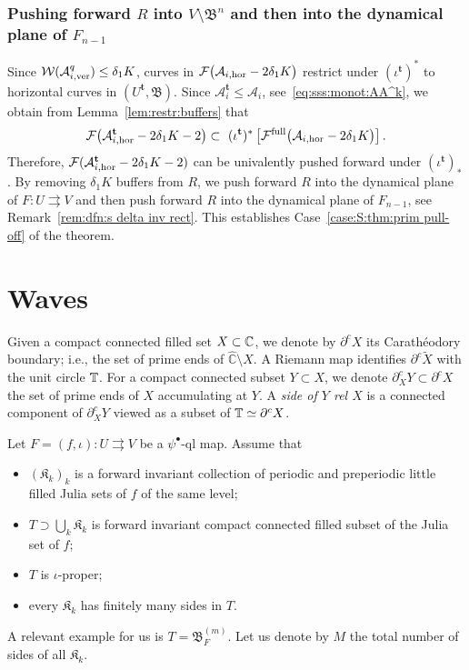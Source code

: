 \documentclass{amsart}
\newcommand\full{{\operatorname{full}}}
\newcommand{\wC}{\widehat{\mathbb{C}}}
\newcommand{\filled}{{\mathfrak K }}
\newcommand{\bush}{{\mathfrak B }}
\newcommand{\bbush}{{\boldsymbol {\mathfrak B} }}
\newcommand{\1}{{\mathbb 1 }}
\newcommand{\Fam}{{\mathcal F}}
\newcommand{\Width}{{\mathcal W}}
\newcommand{\rrto}{\rightrightarrows}
\renewcommand{\AA}{{\mathcal A}}
\newcommand{\bbt}{{\mathbf t}}
\begin{document}
\subsubsection{Pushing forward $R$ into $V\setminus\bbush^{n}$ and then into the dynamical plane of $F_{n-1}$} Since $\Width(\AA_{i,\ver}^{q})\le \delta_1 K$, curves in $\Fam\big(\AA_{i,\hor}-2\delta_1 K\big)$ restrict under $(\iota^\bbt)^*$ to horizontal curves in $(U^\bbt,\bbush)$. Since $\AA^{\bbt}_i \le \AA_i$, see~\eqref{eq:sss:monot:AA^k}, we obtain from Lemma~\ref{lem:restr:buffers} that 
\[\Fam\big(\AA^\bbt_{i,\hor}-2 \delta_1 K -2\big)  \subset\ (\iota^\bbt)^*\left[ \Fam^\full\big(\AA_{i,\hor}-2\delta_1 K\big) \right]. \]
Therefore, $\Fam(\AA^\bbt_{i,\hor}-2 \delta_1 K -2)$ can be univalently pushed forward under $(\iota^\bbt)_*$. By removing $\delta_1K$ buffers from $R$, we push forward $R$ into the dynamical plane of $F\colon  U\rightrightarrows V$ and then push forward $R$ into the dynamical plane of $F_{n-1}$, see Remark~\ref{rem:dfn:s delta inv rect}. This establishes Case~\ref{case:S:thm:prim pull-off} of the theorem.












\section{Waves}\label{waves sec} 
Given a compact connected filled set $ X\subset {\Bbb C}$, we denote by $\partial ^c X$ its Carath\'eodory boundary;  i.e., the set of prime ends of $\wC\setminus X$. A Riemann map identifies $\partial^c \widetilde X$ with the unit circle ${\Bbb T}$. For a compact connected subset $Y\subset X$, we denote $\partial^c_X Y\subset \partial^c X$ the set of prime ends of $X$ accumulating at $Y$. A \emph{side of $Y$ rel $X$} is a connected component of $\partial^c_X Y $ viewed as a subset of $ {\Bbb T}\simeq \partial ^cX$.

Let $F=(f,\iota)\colon U\rrto V$ be a $\psi^\bullet$-ql map. Assume that
\begin{itemize}
\item $(\filled_k)_{k}$ is a forward invariant collection of periodic and preperiodic little filled Julia sets of $f$ of the same level;
\item $T\supset \bigcup_k \filled_k $ is forward invariant compact connected filled subset of the Julia set of $f$;
\item $T$ is $\iota$-proper;
\item every $\filled_k$ has finitely many sides in $T$. 
\end{itemize}
A relevant example for us is $T=\bush_F^{(m)}$. Let us denote by $M$ the total number of sides of all $\filled_k$.
\end{document}
